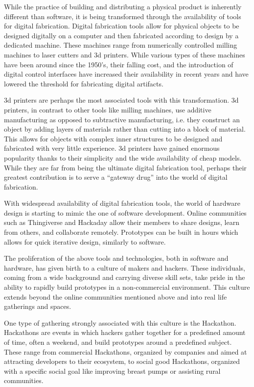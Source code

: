 While the practice of building and distributing a physical product is inherently different than software, it is being transformed through the availability of tools for digital fabrication. Digital fabrication tools allow for physical objects to be designed digitally on a computer and then fabricated according to design by a dedicated machine. These machines range from numerically controlled milling machines to laser cutters and 3d printers. While various types of these machines have been around since the 1950's, their falling cost, and the introduction of digital control interfaces have increased their availability in recent years and have lowered the threshold for fabricating digital artifacts.

3d printers are perhaps the most associated tools with this transformation. 3d printers, in contrast to other tools like milling machines, use additive manufacturing as opposed to subtractive manufacturing, i.e. they construct an object by adding layers of materials rather than cutting into a block of material. This allows for objects with complex inner structures to be designed and fabricated with very little experience. 3d printers have gained enormous popularity thanks to their simplicity and the wide availability of cheap models. While they are far from being the ultimate digital fabrication tool, perhaps their greatest contribution is to serve a ``gateway drug'' into the world of digital fabrication. 

With widespread availability of digital fabrication tools, the world of hardware design is starting to mimic the one of software development. Online communities such as Thingiverse\cite{thingverse} and Hackaday\cite{hackaday} allow their members to share designs, learn from others, and collaborate remotely. Prototypes can be built in hours which allows for quick iterative design, similarly to software. 

The proliferation of the above tools and technologies, both in software and hardware, has given birth to a culture of makers and hackers. These individuals, coming from a wide background and carrying diverse skill sets, take pride in the ability to rapidly build prototypes in a non-commercial environment. This culture extends beyond the online communities mentioned above and into real life gatherings and spaces. 

One type of gathering strongly associated with this culture is the Hackathon. Hackathons are events in which hackers gather together for a predefined amount of time, often a weekend, and build prototypes around a predefined subject. These range from commercial Hackathons, organized by companies and aimed at attracting developers to their ecosystem, to social good Hackathons, organized with a specific social goal like improving breast pumps\cite{d2016feminist} or assisting rural communities\cite{hackforwestmass}.   

